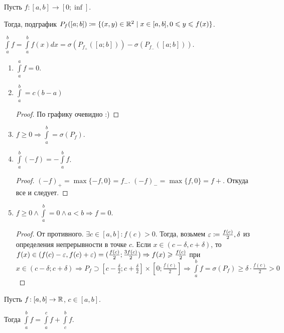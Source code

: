 \begin{definition}
    Пусть $f\!: [a, b] \to [0; \inf]$.

    Тогда, подграфик $P_f([a; b]) \coloneqq \{(x, y) \in \mathbb{R}^2 \mid x \in [a, b], 0 \leqslant y \leqslant f(x)\}$.
\end{definition}
\begin{definition}
    $\int\limits_a^b f = \int\limits_a^b f(x) dx = \sigma(P_{f_+}([a; b])) - \sigma(P_{f_-}([a; b]))$.
\end{definition}
\begin{properties}
    \begin{enumerate}
        \item $\int\limits_a^a f = 0$.
        \item $\int\limits_a^b = c(b-a)$
            \begin{proof}
                По графику очевидно :)
            \end{proof}
        \item $f \ge 0 \Rightarrow \int\limits_a^b = \sigma(P_f)$.
        \item $\int\limits_a^b (-f) = -\int\limits_a^b f$.
             \begin{proof}
                 $(-f)_+ = \max\{-f, 0\} = f_-$.  $(-f)_- = \max\{f, 0\} = f+$.  Откуда все и следует.
            \end{proof}
        \item $f \ge 0 \land \int\limits_a^b = 0 \land a < b \Rightarrow f = 0$.
            \begin{proof}
                От противного. $\exists c \in [a, b]\!: f(c) > 0$. Тогда, возьмем $\varepsilon \coloneqq \frac{f(c)}{2}, \delta$ из определения непрерывности в точке $c$. Если  $x \in (c - \delta, c + \delta)$, то  $f(x) \in (f(c) - \varepsilon, f(c) + \varepsilon) = (\frac{f(c)}{2}; \frac{3f(c)}{2}) \Rightarrow f(x) \geqslant \frac{f(c)}{2}$ при $x \in (c - \delta; c + \delta) \Rightarrow P_f \supset [c-\frac{\delta}{2}; c + \frac{\delta}{2}]\times[0; \frac{f(c)}{2}] \Rightarrow \int\limits_a^b f = \sigma(P_f) \ge \delta \cdot \frac{f(c)}{2} > 0$
            \end{proof}
    \end{enumerate}
\end{properties}
\begin{theorem}
    Пусть $f\!: [a, b] \to \mathbb{R}$,  $c \in [a, b]$.

    Тогда  $\int\limits_a^b f = \int\limits_a^c f + \int\limits_c^b f$.
\end{theorem}
